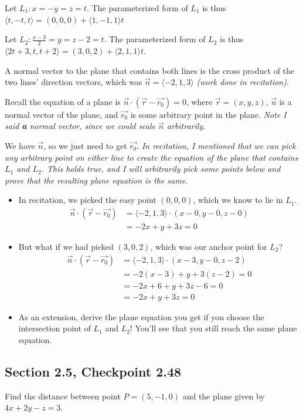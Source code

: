 \documentclass[]{mangos-musings}
\begin{document}
Let $L_1: x=-y=z = t$. The parameterized form of $L_1$ is thus $\langle t, -t, t\rangle = (0, 0, 0) + \langle 1, -1, 1\rangle t$

Let $L_2: \frac{x-3}{2}=y=z-2 = t$. The parameterized form of $L_2$ is thus $\langle2t + 3, t, t + 2 \rangle = (3, 0, 2) + \langle2, 1, 1\rangle t$.

A normal vector to the plane that contains both lines is the cross product of the two lines' direction vectors, which was $\vec{n} = \langle -2, 1, 3\rangle$ \textit{(work done in recitation)}.

Recall the equation of a plane is $\vec{n} \cdot (\vec{r} - \vec{r_0}) = 0$, where $\vec{r} = (x, y, z)$, $\vec{n}$
is a normal vector of the plane, and $\vec{r_0}$ is some arbitrary point in the plane.
\textit{Note I said \textbf{a} normal vector, since we could scale $\vec{n}$ arbitrarily.}

We have $\vec{n}$, so we just need to get $\vec{r_0}$. 
\textit{In recitation, I mentioned that we can pick any arbitrary point on either line to create the equation of the plane that contains $L_1$ and $L_2$. This holds true, and I will arbitrarily pick some points below and prove that the resulting plane equation is the same.} 
\begin{itemize}
  \item In recitation, we picked the easy point $(0, 0, 0)$, which we know to lie in $L_1$. 
  \begin{align*}
    \vec{n} \cdot (\vec{r} - \vec{r_0}) &= \langle -2, 1, 3 \rangle \cdot (x-0, y-0, z-0) 
    \\ &= -2x + y + 3z = 0
  \end{align*}
  \item But what if we had picked $(3, 0, 2)$, which was our anchor point for $L_2$?
  \begin{align*}
    \vec{n} \cdot (\vec{r} - \vec{r_0}) &= \langle -2, 1, 3 \rangle \cdot (x-3, y-0, z-2) 
    \\ &= -2(x-3) + y + 3(z-2) = 0
    \\ &= -2x + 6 + y + 3z - 6 = 0
    \\ &= -2x + y + 3z = 0 \tag{the $6$'s cancel!}
  \end{align*}
  \item As an extension, derive the plane equation you get if you choose the intersection point of $L_1$ and $L_2$! You'll see that you still reach the same plane equation.
\end{itemize}

\subsection{Section 2.5, Checkpoint 2.48}
Find the distance between point $P=(5,-1,0)$ and the plane given by $4x+2y-z=3$.
\end{document}
